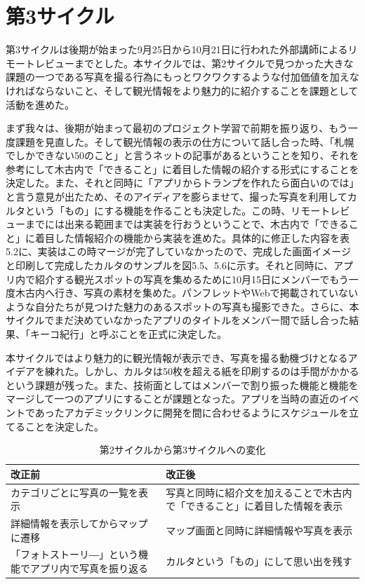 \section{第3サイクル}
第3サイクルは後期が始まった9月25日から10月21日に行われた外部講師によるリモートレビューまでとした。本サイクルでは、第2サイクルで見つかった大きな課題の一つである写真を撮る行為にもっとワクワクするような付加価値を加えなければならないこと、そして観光情報をより魅力的に紹介することを課題として活動を進めた。
\par まず我々は、後期が始まって最初のプロジェクト学習で前期を振り返り、もう一度課題を見直した。そして観光情報の表示の仕方について話し合った時、「札幌でしかできない50のこと」と言うネットの記事があるということを知り、それを参考にして木古内で「できること」に着目した情報の紹介する形式にすることを決定した。また、それと同時に「アプリからトランプを作れたら面白いのでは」と言う意見が出たため、そのアイディアを膨らませて、撮った写真を利用してカルタという「もの」にする機能を作ることも決定した。この時、リモートレビューまでには出来る範囲までは実装を行おうということで、木古内で「できること」に着目した情報紹介の機能から実装を進めた。具体的に修正した内容を表5.2に、実装はこの時マージが完了していなかったので、完成した画面イメージと印刷して完成したカルタのサンプルを図5.5、5.6に示す。それと同時に、アプリ内で紹介する観光スポットの写真を集めるために10月15日にメンバーでもう一度木古内へ行き、写真の素材を集めた。パンフレットやWebで掲載されていないような自分たちが見つけた魅力のあるスポットの写真も撮影できた。さらに、本サイクルでまだ決めていなかったアプリのタイトルをメンバー間で話し合った結果、「キーコ紀行」と呼ぶことを正式に決定した。
\par 本サイクルではより魅力的に観光情報が表示でき、写真を撮る動機づけとなるアイデアを練れた。しかし、カルタは50枚を超える紙を印刷するのは手間がかかるという課題が残った。また、技術面としてはメンバーで割り振った機能と機能をマージして一つのアプリにすることが課題となった。アプリを当時の直近のイベントであったアカデミックリンクに開発を間に合わせるようにスケジュールを立てることを決定した。

\begin{table}[htb]
\centering
\addtocounter{table}{+0}
\caption{第2サイクルから第3サイクルへの変化}
  \begin{tabular}{|l|l|} \hline
    改正前&改正後  \\ \hline 
    カテゴリごとに写真の一覧を表示 & \parbox{20zw}{写真と同時に紹介文を加えることで木古内で「できること」に着目した情報を表示} \\  \hline
    詳細情報を表示してからマップに遷移 &\parbox{20zw}{マップ画面と同時に詳細情報や写真を表示}\\ \hline
    「フォトストーリ―」という機能でアプリ内で写真を振り返る & \parbox{20zw}{カルタという「もの」にして思い出を残す}\\ \hline
  \end{tabular} 
\end{table}

